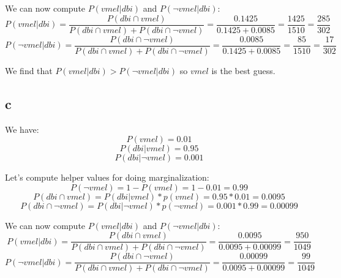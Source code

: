\documentclass[10pt]{article}
\begin{document}
We can now compute $P(vmel|dbi)$ and $P(\neg vmel|dbi)$:
\begin{equation*}
    P(vmel|dbi) = \frac{P(dbi \cap vmel)}{P(dbi \cap vmel) + P(dbi \cap \neg vmel)}
    = \frac{0.1425}{0.1425 + 0.0085} = \frac{1425}{1510} = \frac{285}{302}
\end{equation*}
\begin{equation*}
    P(\neg vmel|dbi) = \frac{P(dbi \cap \neg vmel)}{P(dbi \cap vmel) + P(dbi \cap \neg vmel)}
    = \frac{0.0085}{0.1425 + 0.0085} = \frac{85}{1510} = \frac{17}{302}
\end{equation*}

We find that $P(vmel|dbi) > P(\neg vmel|dbi)$ so $vmel$ is the
best guess.

\subsection*{c}
We have:
\begin{equation*}
    P(vmel) = 0.01
\end{equation*}
\begin{equation*}
    P(dbi|vmel) = 0.95
\end{equation*}
\begin{equation*}
    P(dbi|\neg vmel) = 0.001
\end{equation*}

Let's compute helper values for doing marginalization:
\begin{equation*}
    P(\neg vmel) = 1 - P(vmel) = 1 - 0.01 = 0.99
\end{equation*}
\begin{equation*}
    P(dbi \cap vmel) = P(dbi|vmel) * p(vmel) = 0.95 * 0.01 = 0.0095
\end{equation*}
\begin{equation*}
    P(dbi \cap \neg vmel) = P(dbi|\neg vmel) * p(\neg vmel) = 0.001 * 0.99 = 0.00099
\end{equation*}


We can now compute $P(vmel|dbi)$ and $P(\neg vmel|dbi)$:
\begin{equation*}
    P(vmel|dbi) = \frac{P(dbi \cap vmel)}{P(dbi \cap vmel) + P(dbi \cap \neg vmel)}
    = \frac{0.0095}{0.0095 + 0.00099} = \frac{950}{1049}
\end{equation*}
\begin{equation*}
    P(\neg vmel|dbi) = \frac{P(dbi \cap \neg vmel)}{P(dbi \cap vmel) + P(dbi \cap \neg vmel)}
    = \frac{0.00099}{0.0095 + 0.00099} = \frac{99}{1049}
\end{equation*}
\end{document}
